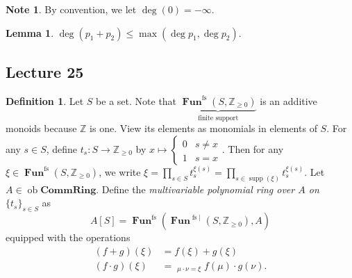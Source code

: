 \documentclass[10pt,letterpaper,cm]{nupset}
\theoremstyle{definition}
\newtheorem*{definition}{Definition}
\newtheorem{note}{Note}
\newtheorem{lemma}{Lemma}
\newcommand{\Z}{\mathbb Z}
\newcommand{\1}{\mathbf{1}}
\newcommand{\0}{\vec 0}
\DeclareMathOperator{\ob}{ob}
\DeclareMathOperator{\fs}{fs}
\DeclareMathOperator{\Fun}{\mathbf{Fun}}
\DeclareMathOperator{\supp}{supp}
\begin{document}
\begin{note}
By convention, we let $\deg(0)= {-}\infty$.
\end{note}

\begin{lemma}
$\deg(p_1 + p_2) \leq \max(\deg p_1, \deg p_2)$.
\end{lemma}

\subsection{Lecture 25}

\begin{definition}
Let $S$ be a set. Note that $\underbrace{\Fun^{\fs}(S, \Z_{\geq 0})}_{\text{finite support}}$ is an additive monoids because $\Z$ is one. View its elements as monomials in elements of $S$. For any $s\in S$, define $t_s : S \to \Z_{\geq 0}$ by $x \mapsto \begin{cases} 0 & s \ne x \\ 1 & s =x \end{cases}.$ Then for any $\xi \in \Fun^{\fs}(S, \Z_{\geq 0})$, we write $\xi = \prod_{s\in S}t_s^{\xi(s)} =\prod_{s\in \supp(\xi)}t_s^{\xi(s)}$.
Let $A \in \ob \mathbf{CommRing}$. Define the \textit{multivariable polynomial ring over $A$ on $\{t_s\}_{s\in S}$} as $$A[S] = \Fun^{\fs}(\Fun^{\fs|}(S, \Z_{\geq 0}), A)$$ equipped with the operations
\begin{align*}
(f+g)(\xi) &= f(\xi) +g(\xi)
\\ (f\cdot g)(\xi) & = \mathop{\sum_{\mu, \nu}}_{\mu \cdot \nu = \xi} f(\mu) \cdot g(\nu).
\end{align*}
\end{definition}
\end{document}
